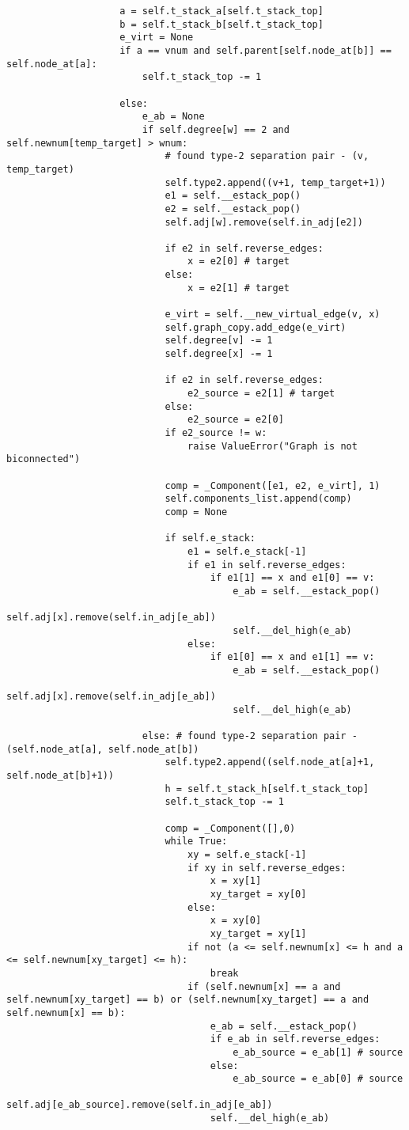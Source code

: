\begin{center}
\begin{verbatim}
					a = self.t_stack_a[self.t_stack_top]
					b = self.t_stack_b[self.t_stack_top]
					e_virt = None
					if a == vnum and self.parent[self.node_at[b]] == self.node_at[a]:
						self.t_stack_top -= 1

					else:
						e_ab = None
						if self.degree[w] == 2 and self.newnum[temp_target] > wnum:
							# found type-2 separation pair - (v, temp_target)
							self.type2.append((v+1, temp_target+1))
							e1 = self.__estack_pop()
							e2 = self.__estack_pop()
							self.adj[w].remove(self.in_adj[e2])

							if e2 in self.reverse_edges:
								x = e2[0] # target
							else:
								x = e2[1] # target

							e_virt = self.__new_virtual_edge(v, x)
							self.graph_copy.add_edge(e_virt)
							self.degree[v] -= 1
							self.degree[x] -= 1

							if e2 in self.reverse_edges:
								e2_source = e2[1] # target
							else:
								e2_source = e2[0]
							if e2_source != w:
								raise ValueError("Graph is not biconnected")

							comp = _Component([e1, e2, e_virt], 1)
							self.components_list.append(comp)
							comp = None

							if self.e_stack:
								e1 = self.e_stack[-1]
								if e1 in self.reverse_edges:
									if e1[1] == x and e1[0] == v:
										e_ab = self.__estack_pop()
										self.adj[x].remove(self.in_adj[e_ab])
										self.__del_high(e_ab)
								else:
									if e1[0] == x and e1[1] == v:
										e_ab = self.__estack_pop()
										self.adj[x].remove(self.in_adj[e_ab])
										self.__del_high(e_ab)

						else: # found type-2 separation pair - (self.node_at[a], self.node_at[b])
							self.type2.append((self.node_at[a]+1, self.node_at[b]+1))
							h = self.t_stack_h[self.t_stack_top]
							self.t_stack_top -= 1

							comp = _Component([],0)
							while True:
								xy = self.e_stack[-1]
								if xy in self.reverse_edges:
									x = xy[1]
									xy_target = xy[0]
								else:
									x = xy[0]
									xy_target = xy[1]
								if not (a <= self.newnum[x] <= h and a <= self.newnum[xy_target] <= h):
									break
								if (self.newnum[x] == a and self.newnum[xy_target] == b) or (self.newnum[xy_target] == a and self.newnum[x] == b):
									e_ab = self.__estack_pop()
									if e_ab in self.reverse_edges:
										e_ab_source = e_ab[1] # source
									else:
										e_ab_source = e_ab[0] # source
									self.adj[e_ab_source].remove(self.in_adj[e_ab])
									self.__del_high(e_ab)


\end{verbatim}
\end{center}
